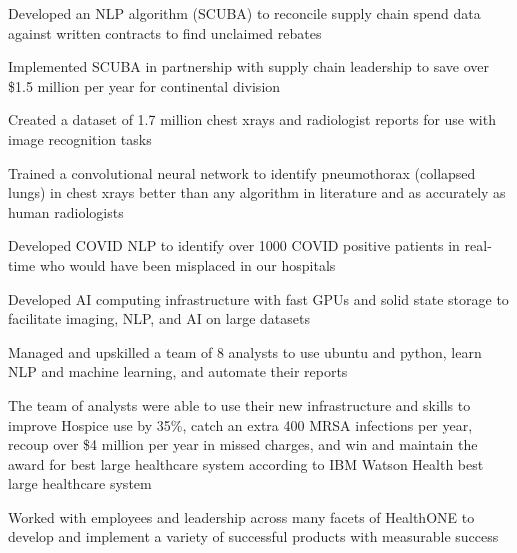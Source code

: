 \begin{resume}
\begin{stuff}
                \item Developed an NLP algorithm (SCUBA) to reconcile supply chain spend data against written contracts to find unclaimed rebates
                \item Implemented SCUBA in partnership with supply chain leadership to save over \$1.5 million per year for continental division
                \item Created a dataset of 1.7 million chest xrays and radiologist reports for use with image recognition tasks
                \item Trained a convolutional neural network to identify pneumothorax (collapsed lungs) in chest xrays better than any algorithm in literature and as accurately as human radiologists
                \item Developed COVID NLP to identify over 1000 COVID positive patients in real-time who would have been misplaced in our hospitals
                \item Developed AI computing infrastructure with fast GPUs and solid state storage to facilitate imaging, NLP, and AI on large datasets
                \item Managed and upskilled a team of 8 analysts to use ubuntu and python, learn NLP and machine learning, and automate their reports
                \item The team of analysts were able to use their new infrastructure and skills to improve Hospice use by 35\%, catch an extra 400 MRSA infections per year, recoup over \$4 million per year in missed charges, and win and maintain the award for best large healthcare system according to IBM Watson Health best large healthcare system 
               \item Worked with employees and leadership across many facets of HealthONE to develop and implement a variety of successful products with measurable success
    \end{stuff}


\end{resume}
